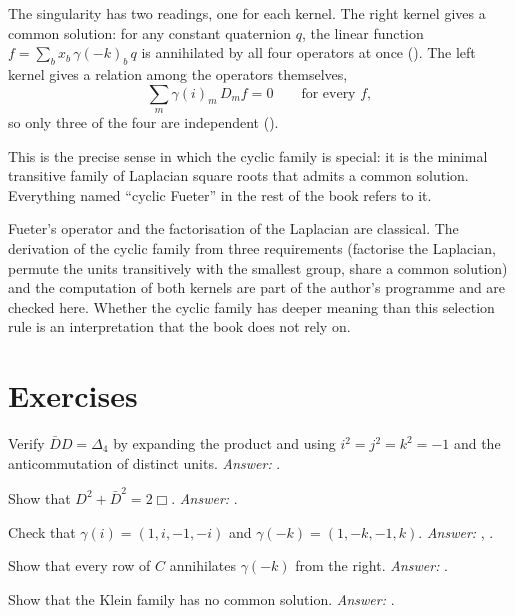 The singularity has two readings, one for each kernel. The right kernel gives a common solution: for any constant quaternion $q$, the linear function $f=\sum_b x_b\,\gamma(-k)_b\,q$ is annihilated by all four operators at once (). The left kernel gives a relation among the operators themselves,
\[
\sum_m\gamma(i)_m\,D_mf=0\qquad\text{for every }f ,
\]
so only three of the four are independent ().

This is the precise sense in which the cyclic family is special: it is the minimal transitive family of Laplacian square roots that admits a common solution. Everything named ``cyclic Fueter'' in the rest of the book refers to it.

\begin{standsbox}
Fueter's operator and the factorisation of the Laplacian are classical. The derivation of the cyclic family from three requirements (factorise the Laplacian, permute the units transitively with the smallest group, share a common solution) and the computation of both kernels are part of the author's programme and are checked here. Whether the cyclic family has deeper meaning than this selection rule is an interpretation that the book does not rely on.
\end{standsbox}

\section*{Exercises}

\begin{exercise}
Verify $\bar DD=\Delta_4$ by expanding the product and using $i^2=j^2=k^2=-1$ and the anticommutation of distinct units. \emph{Answer:} .
\end{exercise}

\begin{exercise}
Show that $D^2+\bar D^2=2\Box$. \emph{Answer:} .
\end{exercise}

\begin{exercise}
Check that $\gamma(i)=(1,i,-1,-i)$ and $\gamma(-k)=(1,-k,-1,k)$. \emph{Answer:} , .
\end{exercise}

\begin{exercise}
Show that every row of $C$ annihilates $\gamma(-k)$ from the right. \emph{Answer:} .
\end{exercise}

\begin{exercise}
Show that the Klein family has no common solution. \emph{Answer:} .
\end{exercise}

